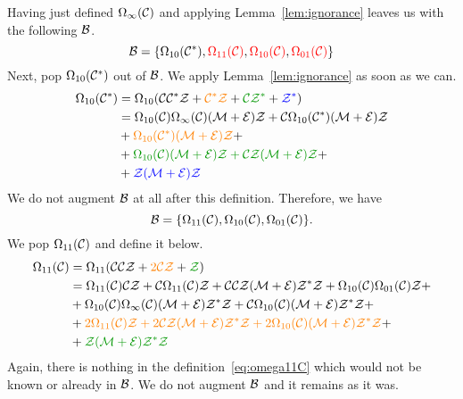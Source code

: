 \documentclass[12pt, a4paper, twoside]{report}
\begin{document}
Having just defined $\Omega_\infty(\mathcal{C})$ and applying Lemma~\ref{lem:ignorance} leaves us with the following $\mathcal{B}$.
$$\mathcal{B} = \{\Omega_{10}(\mathcal{C}^*), \textcolor{red}{\Omega_{11}(\mathcal{C})},\textcolor{red}{\Omega_{10}(\mathcal{C})}, \textcolor{red}{\Omega_{01}(\mathcal{C})}\}$$
Next, pop $\Omega_{10}(\mathcal{C}^*)$ out of $\mathcal{B}$. We apply Lemma~\ref{lem:ignorance} as soon as we can.
\begin{align}
  \begin{aligned}
  \Omega_{10}(\Cstar) &= \Omega_{10}(\C\Cstar\Z + \textcolor{orange}{\Cstar\Z} + \textcolor{green}{\C\Z^*} + \textcolor{blue}{\Z^*})\\
                      &= \Omega_{10}(\C)\Omega_\infty(\C)(\M+\EE)\Z + \C\Omega_{10}(\Cstar)(\M+\EE)\Z\\ %
                      &+\textcolor{orange}{\Omega_{10}(\Cstar)(\M+\EE)\Z}+\\ %
                      &+\textcolor{green}{\Omega_{10}(\C)(\M+\EE)\Z + \C\Z(\M+\EE)\Z} +\\
                      &+\textcolor{blue}{\Z(\M+\EE)\Z}
                    \end{aligned}
                        \label{eq:omega10Cstar}
\end{align}
We do not augment $\mathcal{B}$ at all after this definition. Therefore, we have
$$\mathcal{B} = \{\Omega_{11}(\mathcal{C}),\Omega_{10}(\mathcal{C}), \Omega_{01}(\mathcal{C})\}.$$
We pop $\Omega_{11}(\mathcal{C})$ and define it below.
\begin{align}
  \begin{aligned}
    \Omega_{11}(\C) &= \Omega_{11}(\C\C\Z + \textcolor{orange}{2\C\Z} + \textcolor{green}{\Z})\\
    &= \Omega_{11}(\C)\C\Z + \C\Omega_{11}(\C)\Z + \C\C\Z(\M+\EE)\Z^*\Z + \Omega_{10}(\C)\Omega_{01}(\C)\Z +\\
    &+ \Omega_{10}(\C)\Omega_\infty(\C)(\M+\EE)\Z^*\Z + \C\Omega_{10}(\C)(\M+\EE)\Z^*\Z +\\
    &+ \textcolor{orange}{2\Omega_{11}(\C)\Z + 2\C\Z(\M+\EE)\Z^*\Z + 2\Omega_{10}(\C)(\M+\EE)\Z^*\Z} +\\
    &+\textcolor{green}{\Z(\M+\EE)\Z^*\Z}\\
  \end{aligned}
  \label{eq:omega11C}
\end{align}
Again, there is nothing in the definition~\eqref{eq:omega11C} which would not be known or already in $\mathcal{B}$. We do not augment $\mathcal{B}$ and it remains as it was.
\end{document}
